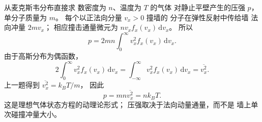 从麦克斯韦分布直接求
数密度为 $n$、温度为 $T$ 的气体
对静止平壁产生的压强 $p$，
单分子质量为 $m$。
\exsolution
每个以正法向分量 $v_x>0$ 撞墙的
分子在弹性反射中传给墙
法向冲量 $2mv_x$；
相应撞击通量微元为
$n v_x f_x(v_x)\,\mathrm dv_x$。
所以
\[
p=2mn\int_0^\infty v_x^2 f_x(v_x)\,\mathrm dv_x.
\]
由于高斯分布为偶函数，
\[
2\int_0^\infty v_x^2 f_x(v_x)\,\mathrm dv_x
=\int_{-\infty}^\infty v_x^2 f_x(v_x)\,\mathrm dv_x
=\overline{v_x^2}.
\]
上一题得到
$\overline{v_x^2}=k_BT/m$，
因此
\[
\boxed{p=mn\overline{v_x^2}=nk_BT}.
\]
\excheck 这是理想气体状态方程的动理论形式；
压强取决于法向动量通量，而不是
墙上单次碰撞冲量大小。
